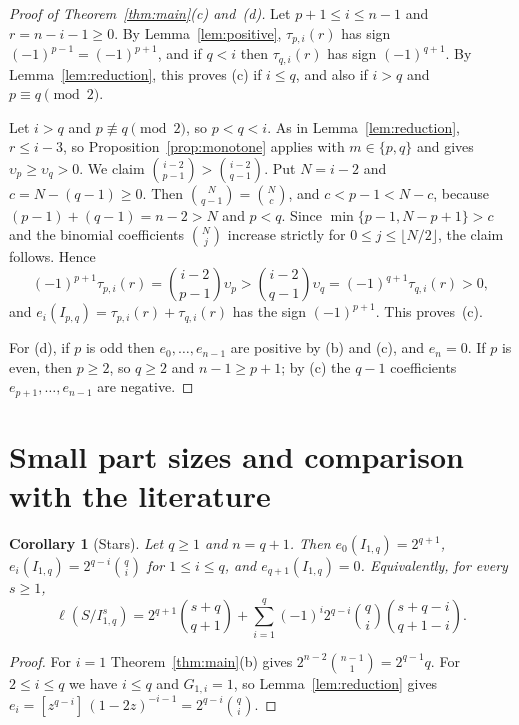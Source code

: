 \documentclass{amsart}
\newtheorem{corollary}[theorem]{Corollary}
\theoremstyle{definition}
\theoremstyle{remark}
\numberwithin{equation}{section}
\newcommand{\cf}[1]{[#1]\,}
\newcommand{\fl}[1]{\lfloor #1\rfloor}
\begin{document}
\begin{proof}[Proof of Theorem~\ref{thm:main}\textup{(c)} and~\textup{(d)}]
Let $p+1\le i\le n-1$ and $r=n-i-1\ge0$. By Lemma~\ref{lem:positive},
$\tau_{p,i}(r)$ has sign $(-1)^{p-1}=(-1)^{p+1}$, and if $q<i$ then
$\tau_{q,i}(r)$ has sign $(-1)^{q+1}$. By Lemma~\ref{lem:reduction}, this proves
(c) if $i\le q$, and also if $i>q$ and $p\equiv q\pmod2$.

Let $i>q$ and $p\not\equiv q\pmod 2$, so $p<q<i$. As in
Lemma~\ref{lem:reduction}, $r\le i-3$, so Proposition~\ref{prop:monotone}
applies with $m\in\{p,q\}$ and gives $\upsilon_p\ge\upsilon_q>0$. We claim
$\binom{i-2}{p-1}>\binom{i-2}{q-1}$. Put $N=i-2$ and $c=N-(q-1)\ge0$. Then
$\binom{N}{q-1}=\binom{N}{c}$, and $c<p-1<N-c$, because $(p-1)+(q-1)=n-2>N$ and
$p<q$. Since $\min\{p-1,N-p+1\}>c$ and the binomial coefficients
$\binom{N}{j}$ increase strictly for $0\le j\le\fl{N/2}$, the claim follows.
Hence
\[
  (-1)^{p+1}\tau_{p,i}(r)=\binom{i-2}{p-1}\upsilon_p
  >\binom{i-2}{q-1}\upsilon_q=(-1)^{q+1}\tau_{q,i}(r)>0,
\]
and $e_i(I_{p,q})=\tau_{p,i}(r)+\tau_{q,i}(r)$ has the sign $(-1)^{p+1}$. This
proves~(c).

For (d), if $p$ is odd then $e_0,\dots,e_{n-1}$ are positive by (b) and (c), and
$e_n=0$. If $p$ is even, then $p\ge2$, so $q\ge2$ and $n-1\ge p+1$; by (c) the
$q-1$ coefficients $e_{p+1},\dots,e_{n-1}$ are negative.
\end{proof}

\section{Small part sizes and comparison with the literature}\label{sec:examples}

\begin{corollary}[Stars]\label{cor:star}
Let $q\ge1$ and $n=q+1$. Then $e_0(I_{1,q})=2^{q+1}$,
$e_i(I_{1,q})=2^{q-i}\binom{q}{i}$ for $1\le i\le q$, and $e_{q+1}(I_{1,q})=0$.
Equivalently, for every $s\ge1$,
\[
  \ell(S/I_{1,q}^s)=2^{q+1}\binom{s+q}{q+1}
  +\sum_{i=1}^{q}(-1)^i2^{q-i}\binom{q}{i}\binom{s+q-i}{q+1-i}.
\]
\end{corollary}

\begin{proof}
For $i=1$ Theorem~\ref{thm:main}(b) gives $2^{n-2}\binom{n-1}{1}=2^{q-1}q$. For
$2\le i\le q$ we have $i\le q$ and $G_{1,i}=1$, so Lemma~\ref{lem:reduction}
gives $e_i=\cf{z^{q-i}}(1-2z)^{-i-1}=2^{q-i}\binom{q}{i}$.
\end{proof}
\end{document}
